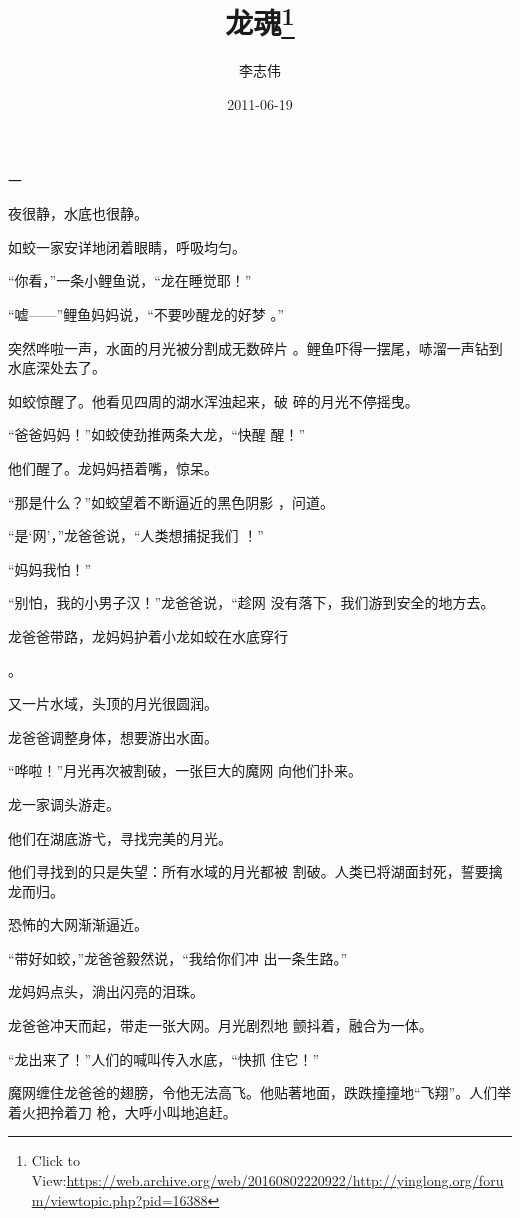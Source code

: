 \documentclass{article}
\title{龙魂\footnote{Click to View:\url{https://web.archive.org/web/20160802220922/http://yinglong.org/forum/viewtopic.php?pid=16388}}}
\author{李志伟}
\date{2011-06-19}
\begin{document}

\maketitle


\Large


﻿一 


夜很静，水底也很静。 


如蛟一家安详地闭着眼睛，呼吸均匀。 

“你看，”一条小鲤鱼说，“龙在睡觉耶！”
 

“嘘——”鲤鱼妈妈说，“不要吵醒龙的好梦
。” 

突然哗啦一声，水面的月光被分割成无数碎片
。鲤鱼吓得一摆尾，哧溜一声钻到水底深处去了。 

\newpage

如蛟惊醒了。他看见四周的湖水浑浊起来，破
碎的月光不停摇曳。 

“爸爸妈妈！”如蛟使劲推两条大龙，“快醒
醒！” 


他们醒了。龙妈妈捂着嘴，惊呆。 

“那是什么？”如蛟望着不断逼近的黑色阴影
，问道。 

“是‘网’，”龙爸爸说，“人类想捕捉我们
！” 


“妈妈我怕！” 

“别怕，我的小男子汉！”龙爸爸说，“趁网
没有落下，我们游到安全的地方去。 

龙爸爸带路，龙妈妈护着小龙如蛟在水底穿行

\newpage
。 


又一片水域，头顶的月光很圆润。 


龙爸爸调整身体，想要游出水面。 

“哗啦！”月光再次被割破，一张巨大的魔网
向他们扑来。 


龙一家调头游走。 


他们在湖底游弋，寻找完美的月光。 

他们寻找到的只是失望：所有水域的月光都被
割破。人类已将湖面封死，誓要擒龙而归。 


恐怖的大网渐渐逼近。 

“带好如蛟，”龙爸爸毅然说，“我给你们冲
出一条生路。” 


\newpage

龙妈妈点头，淌出闪亮的泪珠。 

龙爸爸冲天而起，带走一张大网。月光剧烈地
颤抖着，融合为一体。 

“龙出来了！”人们的喊叫传入水底，“快抓
住它！” 

魔网缠住龙爸爸的翅膀，令他无法高飞。他贴著地面，跌跌撞撞地“飞翔”。人们举着火把拎着刀
枪，大呼小叫地追赶。 
\end{document}

